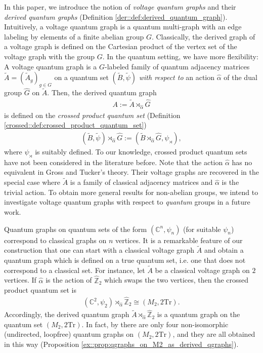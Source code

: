 \documentclass{amsart}
\newcommand{\C}{\mathbb{C}}
\newcommand{\Z}{\mathbb{Z}}
\theoremstyle{definition}
\theoremstyle{definition}
\begin{document}
In this paper, we introduce the notion of \emph{voltage quantum graphs} and their \emph{derived quantum graphs} (Definition \ref{der::def:derived_quantum_graph}).
Intuitively, a voltage quantum graph is a quantum multi-graph with an edge labeling by elements of a finite abelian group $G$. Classically, the derived graph of a voltage graph is defined on the Cartesian product of the vertex set of the voltage graph with the group $G$. In the quantum setting, we have more flexibility: A voltage quantum graph is a $G$-labeled family of quantum adjacency matrices $\tilde{A} = (\tilde{A}_g)_{g \in G}$ on a quantum set $(\tilde{B}, \tilde{\psi})$ \textit{with respect to} an action $\hat{\alpha}$ of the dual group $\hat{G}$ on $\tilde{A}$. Then, the derived quantum graph
\begin{align*}
    A := \tilde{A} \rtimes_{\hat{\alpha}} \hat{G}
\end{align*}
is defined on the \emph{crossed product quantum set} (Definition \ref{crossed::def:crossed_product_quantum_set})
\begin{align*}
    (\tilde{B}, \tilde{\psi}) \rtimes_{\hat{\alpha}} \hat{G} := (\tilde{B} \rtimes_{\hat{\alpha}} \hat{G}, \psi_\rtimes),
\end{align*}
where $\psi_\rtimes$ is suitably defined.
To our knowledge, crossed product quantum sets have not been considered in the literature before. Note that the action $\hat{\alpha}$ has no equivalent in Gross and Tucker's theory. Their voltage graphs are recovered in the special case where $\tilde{A}$ is a family of classical adjacency matrices and $\hat{\alpha}$ is the trivial action. To obtain more general results for non-abelian groups, we intend to investigate voltage quantum graphs with respect to \emph{quantum} groups in a future work.

Quantum graphs on quantum sets of the form $(\C^n, \psi_n)$ (for suitable $\psi_n$) correspond to classical graphs on $n$ vertices. It is a remarkable feature of our construction that one can start with a classical voltage graph $\tilde{A}$ and obtain a quantum graph which is defined on a true quantum set, i.e. one that does not correspond to a classical set. For instance, let $\tilde{A}$ be a classical voltage graph on $2$ vertices. If $\hat{\alpha}$ is the action of $\hat{\Z}_2$ which swaps the two vertices, then the crossed product quantum set is
\begin{align*}
    (\C^2, \psi_2) \rtimes_{\hat{\alpha}} \hat{\Z}_2 \cong (M_2, 2 \mathrm{Tr}).
\end{align*}
Accordingly, the derived quantum graph $\tilde{A} \rtimes_{\hat{\alpha}} \hat{\Z}_2$ is a quantum graph on the quantum set $(M_2, 2 \mathrm{Tr})$. In fact, by \cite{matsuda_classification_2022, gromada_examples_2022} there are only four non-isomorphic (undirected, loopfree) quantum graphs on $(M_2, 2 \mathrm{Tr})$, and they are all obtained in this way (Proposition \ref{ex::prop:qgraphs_on_M2_as_derived_qgraphs}).
\end{document}
